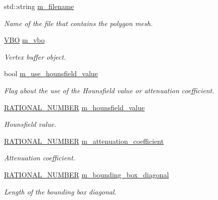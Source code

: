 \begin{DoxyCompactItemize}
\item 
std::string \hyperlink{class_graphics_1_1_triangle_mesh_a56b0d42513921080062ff7c9f3099b28}{m\_\-filename}
\begin{DoxyCompactList}\small\item\em Name of the file that contains the polygon mesh. \end{DoxyCompactList}\item 
\hyperlink{class_graphics_1_1_v_b_o}{VBO} \hyperlink{class_graphics_1_1_triangle_mesh_aa2ff3ba03b750b6b0900a02614db0277}{m\_\-vbo}
\begin{DoxyCompactList}\small\item\em Vertex buffer object. \end{DoxyCompactList}\item 
bool \hyperlink{class_graphics_1_1_triangle_mesh_afd8f8397af871a5c9ed07545cc12ae49}{m\_\-use\_\-hounsfield\_\-value}
\begin{DoxyCompactList}\small\item\em Flag about the use of the Hounsfield value or attenuation coefficient. \end{DoxyCompactList}\item 
\hyperlink{namespace_utilities_a40969b96bd8d847b962e297cb79f08ce}{RATIONAL\_\-NUMBER} \hyperlink{class_graphics_1_1_triangle_mesh_a08404cbf123b9ed99bd10ddb1b4626a4}{m\_\-hounsfield\_\-value}
\begin{DoxyCompactList}\small\item\em Hounsfield value. \end{DoxyCompactList}\item 
\hyperlink{namespace_utilities_a40969b96bd8d847b962e297cb79f08ce}{RATIONAL\_\-NUMBER} \hyperlink{class_graphics_1_1_triangle_mesh_af5c6eb131b9455e3b2dad2b4637b3fea}{m\_\-attenuation\_\-coefficient}
\begin{DoxyCompactList}\small\item\em Attenuation coefficient. \end{DoxyCompactList}\item 
\hyperlink{namespace_utilities_a40969b96bd8d847b962e297cb79f08ce}{RATIONAL\_\-NUMBER} \hyperlink{class_graphics_1_1_triangle_mesh_ab5f109d58c738507ae99bdcddcb48c34}{m\_\-bounding\_\-box\_\-diagonal}
\begin{DoxyCompactList}\small\item\em Length of the bounding box diagonal. \end{DoxyCompactList}\item 

\end{DoxyCompactItemize}
